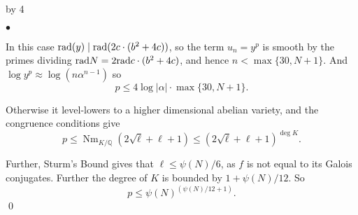 \documentclass[12pt]{scrartcl}
\newenvironment{citemize}{
\begin{list}{$\bullet$}{\setlength{\itemsep}{0pt} \setlength{\rightmargin}{0pt} \setlength{\leftmargin}{0.5\labelwidth} \setlength{\topsep}{0pt}}
}{\end{list}}
\def\Q{{\mathbb Q}}
\newcommand{\rad}{{\rm{rad}}}
\newcommand{\Nm}{\operatorname{Nm}}
\def\anzspalten{4}
\newlength{\kastenwidth}
\newenvironment{kasten}{%
  \begin{lrbox}{\dummybox}%
    \begin{minipage}{0.96\linewidth}}%
    {\end{minipage}%
  \end{lrbox}%
  \raisebox{-\depth}{\psshadowbox[framesep=1em]{\usebox{\dummybox}}}\\[0.5em]}
\newenvironment{spalte}{%
  \setlength\kastenwidth{1.2\textwidth}
  \divide\kastenwidth by \anzspalten
  \begin{minipage}[t]{\kastenwidth}}{\end{minipage}\hfill}
\begin{document}
\begin{lrbox}{\spalten}
{\begin{spalte}
\begin{kasten}
\begin{citemize}
\item In this case $\rad(y) \mid \rad(2c \cdot (b^2+4c))$, so the term $u_n = y^p$ is smooth by the primes dividing $\rad{N} = 2\rad{c\cdot (b^2+4c)}$, and hence $n < \max\{30, N+1\}$.  And $\log y^p \approx \log(n \alpha^{n-1})$ so
\[p \leq 4 \log |\alpha| \cdot \max\{30, N+1\}. \]

\item Otherwise it level-lowers to a higher dimensional abelian variety, and the congruence conditions give
\[ p \leq \Nm_{K/\Q}(2\sqrt{\ell} +\ell+1) \leq (2\sqrt{\ell} +\ell+1)^{\operatorname{deg}{K}}.\]

\item Further, Sturm's Bound gives that $\ell \leq \psi(N)/6$, as $f$ is not equal to its Galois conjugates.  Further the degree of $K$ is bounded by $1+\psi(N)/12$.  So
\[p \leq \psi(N)^{(\psi(N)/12+1)}.\]
\qed
\end{citemize}

\end{kasten}













\end{spalte}}
\end{lrbox}
\end{document}
